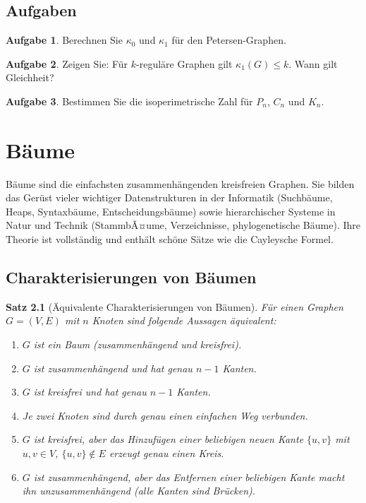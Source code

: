 ﻿\documentclass[a4paper,12pt,openany,oneside]{book}
\theoremstyle{definition}
\newtheorem{aufgabe}{Aufgabe}[chapter]
\theoremstyle{plain}
\newtheorem{satz}{Satz}[chapter]
\theoremstyle{remark}
\begin{document}
\section{Aufgaben}

\begin{aufgabe}
  Berechnen Sie $\kappa_0$ und $\kappa_1$ f\"ur den Petersen-Graphen.
\end{aufgabe}

\begin{aufgabe}
  Zeigen Sie: F\"ur $k$-regul\"are Graphen gilt $\kappa_1(G) \leq k$.
  Wann gilt Gleichheit?
\end{aufgabe}

\begin{aufgabe}
  Bestimmen Sie die isoperimetrische Zahl f\"ur $P_n$, $C_n$ und $K_n$.
\end{aufgabe}

\chapter{B\"aume}

B\"aume sind die einfachsten zusammenh\"angenden kreisfreien Graphen.
Sie bilden das Ger\"ust vieler wichtiger Datenstrukturen in der Informatik
(Suchb\"aume, Heaps, Syntaxb\"aume, Entscheidungsb\"aume) sowie
hierarchischer Systeme in Natur und Technik (StammbÃ¤ume, Verzeichnisse,
phylogenetische B\"aume). Ihre Theorie ist vollst\"andig und enth\"alt
sch\"one S\"atze wie die Cayleysche Formel.

\section{Charakterisierungen von B\"aumen}

\begin{satz}[\"Aquivalente Charakterisierungen von B\"aumen]
  \label{satz:baum-char}
  F\"ur einen Graphen $G = (V,E)$ mit $n$ Knoten sind folgende Aussagen
  \"aquivalent:
  \begin{enumerate}
    \item $G$ ist ein Baum (zusammenh\"angend und kreisfrei).
    \item $G$ ist zusammenh\"angend und hat genau $n-1$ Kanten.
    \item $G$ ist kreisfrei und hat genau $n-1$ Kanten.
    \item Je zwei Knoten sind durch genau einen einfachen Weg verbunden.
    \item $G$ ist kreisfrei, aber das Hinzuf\"ugen einer beliebigen neuen
          Kante $\{u,v\}$ mit $u,v \in V$, $\{u,v\} \notin E$ erzeugt
          genau einen Kreis.
    \item $G$ ist zusammenh\"angend, aber das Entfernen einer beliebigen
          Kante macht ihn unzusammenh\"angend (alle Kanten sind Br\"ucken).
  \end{enumerate}
\end{satz}
\end{document}
